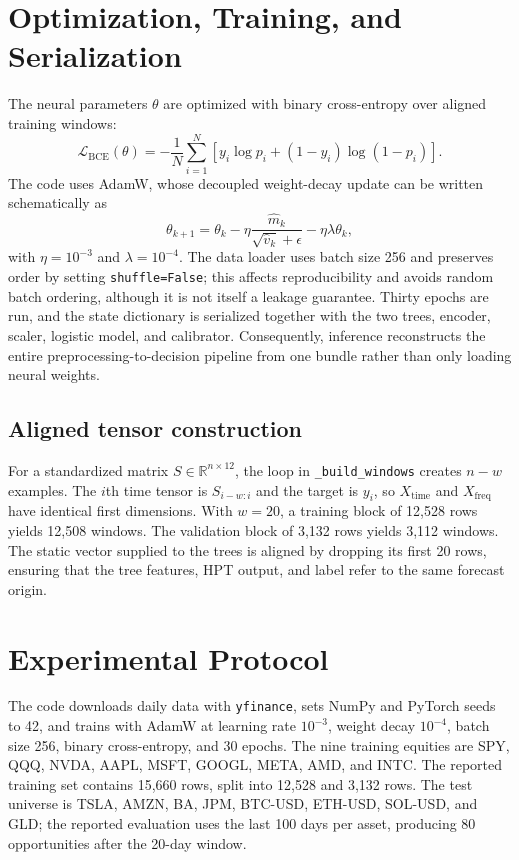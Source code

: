 \documentclass[11pt]{article}
\newcommand{\R}{\mathbb{R}}
\begin{document}
\section{Optimization, Training, and Serialization}
The neural parameters $\theta$ are optimized with binary cross-entropy over aligned training windows:
\begin{equation}
 \mathcal L_{\mathrm{BCE}}(\theta)=-\frac{1}{N}\sum_{i=1}^{N}\left[y_i\log p_i+(1-y_i)\log(1-p_i)\right].
\end{equation}
The code uses AdamW, whose decoupled weight-decay update can be written schematically as
\begin{equation}
 \theta_{k+1}=\theta_k-\eta\frac{\widehat m_k}{\sqrt{\widehat v_k}+\epsilon}-\eta\lambda\theta_k,
\end{equation}
with $\eta=10^{-3}$ and $\lambda=10^{-4}$. The data loader uses batch size 256 and preserves order by setting \texttt{shuffle=False}; this affects reproducibility and avoids random batch ordering, although it is not itself a leakage guarantee. Thirty epochs are run, and the state dictionary is serialized together with the two trees, encoder, scaler, logistic model, and calibrator. Consequently, inference reconstructs the entire preprocessing-to-decision pipeline from one bundle rather than only loading neural weights.

\subsection{Aligned tensor construction}
For a standardized matrix $S\in\R^{n\times12}$, the loop in \texttt{\_build\_windows} creates $n-w$ examples. The $i$th time tensor is $S_{i-w:i}$ and the target is $y_i$, so $X_{\mathrm{time}}$ and $X_{\mathrm{freq}}$ have identical first dimensions. With $w=20$, a training block of 12,528 rows yields 12,508 windows. The validation block of 3,132 rows yields 3,112 windows. The static vector supplied to the trees is aligned by dropping its first 20 rows, ensuring that the tree features, HPT output, and label refer to the same forecast origin.

\section{Experimental Protocol}
The code downloads daily data with \texttt{yfinance}, sets NumPy and PyTorch seeds to 42, and trains with AdamW at learning rate $10^{-3}$, weight decay $10^{-4}$, batch size 256, binary cross-entropy, and 30 epochs. The nine training equities are SPY, QQQ, NVDA, AAPL, MSFT, GOOGL, META, AMD, and INTC. The reported training set contains 15,660 rows, split into 12,528 and 3,132 rows. The test universe is TSLA, AMZN, BA, JPM, BTC-USD, ETH-USD, SOL-USD, and GLD; the reported evaluation uses the last 100 days per asset, producing 80 opportunities after the 20-day window.
\end{document}

